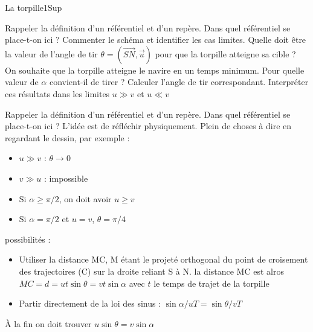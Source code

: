 \begin{exercise}{La torpille}{1}{Sup}
\begin{questions}
    \questioncours Rappeler la définition d'un référentiel et d'un repère. Dans quel référentiel se place-t-on ici ?
    \question Commenter le schéma et identifier les cas limites.
    \question Quelle doit être la valeur de l'angle de tir $\theta = (\vec{SN}, \vec{u})$ pour que la torpille atteigne sa cible ?
    \question On souhaite que la torpille atteigne le navire en un temps minimum. Pour quelle valeur de $\alpha$ convient-il de tirer ? Calculer l'angle de tir correspondant. Interpréter ces résultats dans les limites $ u \gg v$ et $u \ll v$
\end{questions}

\end{exercise}

\begin{solution}


\begin{questions}
    \questioncours Rappeler la définition d'un référentiel et d'un repère. Dans quel référentiel se place-t-on ici ?
    \question L'idée est de réfléchir physiquement. Plein de choses à dire en regardant le dessin, par exemple :
    \begin{itemize}
        \item $u \gg v$ : $\theta \rightarrow 0$
        \item $v \gg u$ : impossible
        \item Si $\alpha \geq \pi/2$, on doit avoir $u \geq v$
        \item Si $\alpha = \pi/2$ et $u = v$, $\theta = \pi/4$
    \end{itemize}
    
     possibilités :
    \begin{itemize}
        \item Utiliser la distance MC, M étant le projeté orthogonal du point de croisement des trajectoires (C) sur la droite reliant S à N. la distance MC est alros $MC = d = ut \sin \theta = v t \sin \alpha$ avec $t$ le temps de trajet de la torpille
        \item Partir directement de la loi des sinus : $\sin \alpha / uT = \sin \theta / vT$
    \end{itemize}
    À la fin on doit trouver $u \sin \theta = v \sin \alpha$
    
\begin{center}
\end{center}
\end{questions}
\end{solution}
